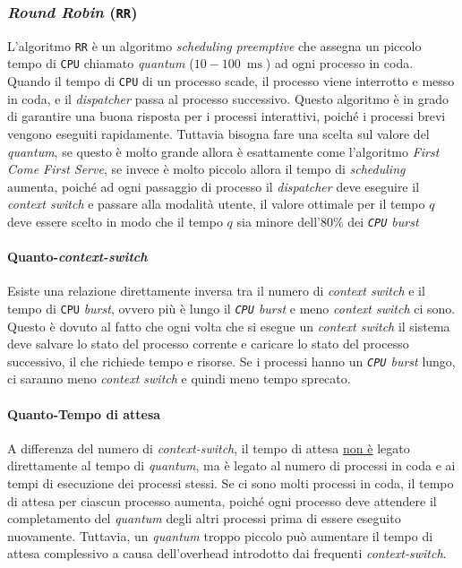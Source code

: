             \subsubsection{\textit{Round Robin} (\texttt{RR})}
                L'algoritmo \texttt{RR} è un algoritmo \textit{scheduling} \textit{preemptive} che assegna un piccolo tempo di \texttt{CPU} chiamato \textit{quantum} ($10-100\ \operatorname{ms}$) ad ogni processo in coda. Quando il tempo di \texttt{CPU} di un processo scade, il processo viene interrotto e messo in coda, e il \textit{dispatcher} passa al processo successivo. Questo algoritmo è in grado di garantire una buona risposta per i processi interattivi, poiché i processi brevi vengono eseguiti rapidamente. Tuttavia bisogna fare una scelta sul valore del \textit{quantum}, se questo è molto grande allora è esattamente come l'algoritmo \textit{First Come First Serve}, se invece è molto piccolo allora il tempo di \textit{scheduling} aumenta, poiché ad ogni passaggio di processo il \textit{dispatcher} deve eseguire il \textit{context switch} e passare alla modalità utente, il valore ottimale per il tempo $q$ deve essere scelto in modo che il tempo $q$ sia minore dell'$80\%$ dei \textit{\texttt{CPU} burst}
                \paragraph{Quanto-\textit{context-switch}} Esiste una relazione direttamente inversa tra il numero di \textit{context switch} e il tempo di \texttt{CPU} \textit{burst}, ovvero più è lungo il \textit{\texttt{CPU} burst} e meno \textit{context switch} ci sono. Questo è dovuto al fatto che ogni volta che si esegue un \textit{context switch} il sistema deve salvare lo stato del processo corrente e caricare lo stato del processo successivo, il che richiede tempo e risorse. Se i processi hanno un \textit{\texttt{CPU} burst} lungo, ci saranno meno \textit{context switch} e quindi meno tempo sprecato.
                \paragraph{Quanto-Tempo di attesa} A differenza del numero di \textit{context-switch}, il tempo di attesa \underline{non è} legato direttamente al tempo di \textit{quantum}, ma è legato al numero di processi in coda e ai tempi di esecuzione dei processi stessi. Se ci sono molti processi in coda, il tempo di attesa per ciascun processo aumenta, poiché ogni processo deve attendere il completamento del \textit{quantum} degli altri processi prima di essere eseguito nuovamente. Tuttavia, un \textit{quantum} troppo piccolo può aumentare il tempo di attesa complessivo a causa dell'overhead introdotto dai frequenti \textit{context-switch}.
